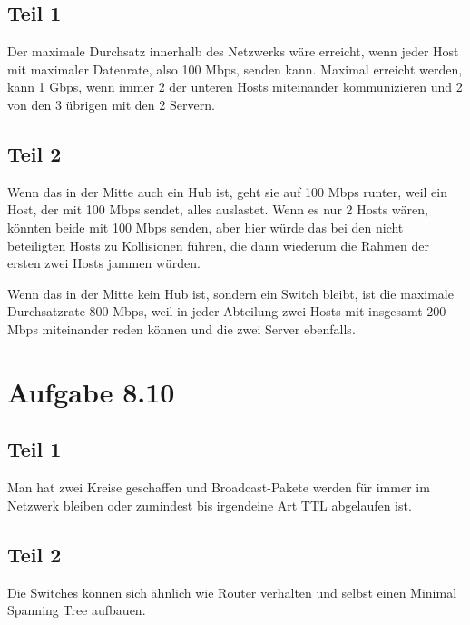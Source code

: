 \documentclass[10pt,a4paper]{article}
\begin{document}
\subsection{Teil 1}

Der maximale Durchsatz innerhalb des Netzwerks wäre erreicht, wenn jeder Host
mit maximaler Datenrate, also 100 Mbps, senden kann. Maximal erreicht werden,
kann 1 Gbps, wenn immer 2 der unteren Hosts miteinander kommunizieren und 2 von
den 3 übrigen mit den 2 Servern.

\subsection{Teil 2}

Wenn das in der Mitte auch ein Hub ist, geht sie auf 100 Mbps runter, weil ein
Host, der mit 100 Mbps sendet, alles auslastet. Wenn es nur 2 Hosts wären,
könnten beide mit 100 Mbps senden, aber hier würde das bei den nicht beteiligten
Hosts zu Kollisionen führen, die dann wiederum die Rahmen der ersten zwei Hosts
jammen würden.

Wenn das in der Mitte kein Hub ist, sondern ein Switch bleibt, ist die maximale
Durchsatzrate 800 Mbps, weil in jeder Abteilung zwei Hosts mit insgesamt 200
Mbps miteinander reden können und die zwei Server ebenfalls.

\section{Aufgabe 8.10}

\subsection{Teil 1}

Man hat zwei Kreise geschaffen und Broadcast-Pakete werden für immer im Netzwerk
bleiben oder zumindest bis irgendeine Art TTL abgelaufen ist.

\subsection{Teil 2}

Die Switches können sich ähnlich wie Router verhalten und selbst einen Minimal
Spanning Tree aufbauen.
\end{document}
